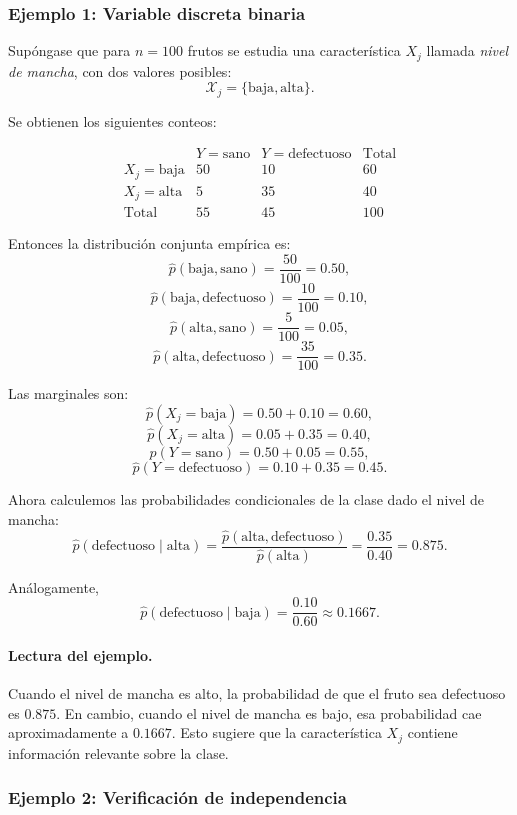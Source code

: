 \documentclass{article}
\begin{document}
\subsubsection*{Ejemplo 1: Variable discreta binaria}

Supóngase que para \(n=100\) frutos se estudia una característica \(X_j\) llamada \emph{nivel de mancha}, con dos valores posibles:
\[
\mathcal{X}_j=\{\text{baja},\text{alta}\}.
\]

Se obtienen los siguientes conteos:

\[
\begin{array}{c|cc|c}
 & Y=\text{sano} & Y=\text{defectuoso} & \text{Total} \\
\hline
X_j=\text{baja} & 50 & 10 & 60 \\
X_j=\text{alta} & 5 & 35 & 40 \\
\hline
\text{Total} & 55 & 45 & 100
\end{array}
\]

Entonces la distribución conjunta empírica es:
\[
\widehat{p}(\text{baja},\text{sano})=\frac{50}{100}=0.50,
\]
\[
\widehat{p}(\text{baja},\text{defectuoso})=\frac{10}{100}=0.10,
\]
\[
\widehat{p}(\text{alta},\text{sano})=\frac{5}{100}=0.05,
\]
\[
\widehat{p}(\text{alta},\text{defectuoso})=\frac{35}{100}=0.35.
\]

Las marginales son:
\[
\widehat{p}(X_j=\text{baja})=0.50+0.10=0.60,
\]
\[
\widehat{p}(X_j=\text{alta})=0.05+0.35=0.40,
\]
\[
\widehat{p}(Y=\text{sano})=0.50+0.05=0.55,
\]
\[
\widehat{p}(Y=\text{defectuoso})=0.10+0.35=0.45.
\]

Ahora calculemos las probabilidades condicionales de la clase dado el nivel de mancha:
\[
\widehat{p}(\text{defectuoso}\mid \text{alta})
=
\frac{\widehat{p}(\text{alta},\text{defectuoso})}{\widehat{p}(\text{alta})}
=
\frac{0.35}{0.40}
=0.875.
\]

Análogamente,
\[
\widehat{p}(\text{defectuoso}\mid \text{baja})
=
\frac{0.10}{0.60}
\approx 0.1667.
\]

\paragraph{Lectura del ejemplo.}
Cuando el nivel de mancha es alto, la probabilidad de que el fruto sea defectuoso es \(0.875\). En cambio, cuando el nivel de mancha es bajo, esa probabilidad cae aproximadamente a \(0.1667\). Esto sugiere que la característica \(X_j\) contiene información relevante sobre la clase.

\subsubsection*{Ejemplo 2: Verificación de independencia}
\end{document}
